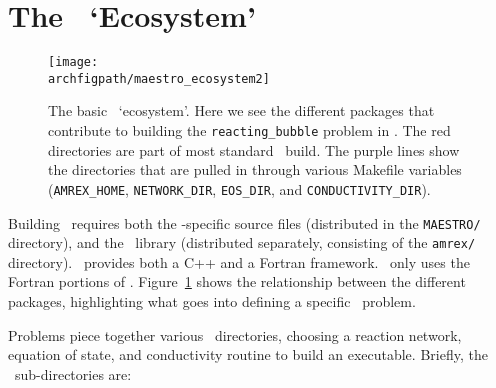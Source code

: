 \section{The \maestro\ `Ecosystem'}

\begin{figure}[]
\centering
\texttt{[image: \\archfigpath/maestro\_ecosystem2]}
\caption[\maestro\ `ecosystem'] {\label{fig:arch:eco} The basic
  \maestro\ `ecosystem'.  Here we see the different packages that
  contribute to building the {\tt reacting\_bubble} problem in \maestro.  The
  red directories are part of most standard \maestro\ build.  The
  purple lines show the directories that are pulled in through
  various Makefile variables ({\tt AMREX\_HOME}, {\tt NETWORK\_DIR},
  {\tt EOS\_DIR}, and {\tt CONDUCTIVITY\_DIR}).}
\end{figure}


Building \maestro\ requires both the \maestro-specific source
files (distributed in the {\tt MAESTRO/} directory), and the
\amrex\ library (distributed separately, consisting of the {\tt amrex/} directory).
\amrex\ provides both a C++ and a Fortran framework.  \maestro\
only uses the Fortran portions of \amrex.  Figure~\ref{fig:arch:eco}
shows the relationship between the different packages, highlighting
what goes into defining a specific \maestro\ problem.

Problems piece together various \maestro\ directories, choosing a
reaction network, equation of state, and conductivity routine to build
an executable.  Briefly, the \maestro\ sub-directories are:

